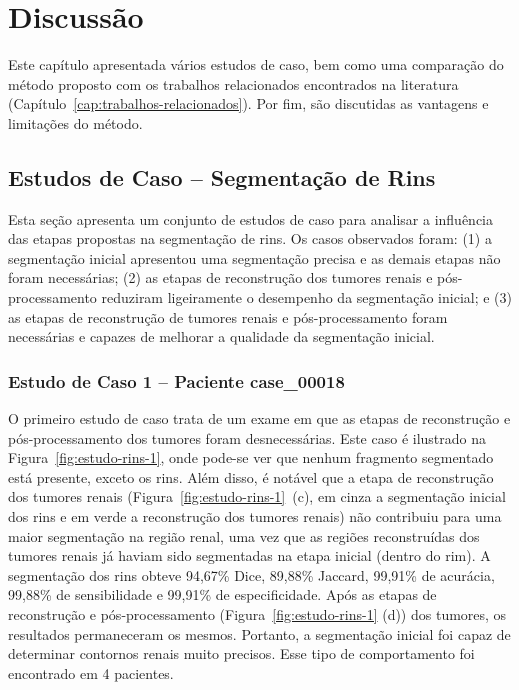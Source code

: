 \chapter{Discussão}
\label{cap:discussao}
\phantom{0}

Este capítulo apresentada vários estudos de caso, bem como uma comparação do método proposto com os trabalhos relacionados encontrados na literatura (Capítulo~\ref{cap:trabalhos-relacionados}). Por fim, são discutidas as vantagens e limitações do método.

\section{Estudos de Caso – Segmentação de Rins}
\label{sec:estudos-segmentacao-rins}

Esta seção apresenta um conjunto de estudos de caso para analisar a influência das etapas propostas na segmentação de rins. Os casos observados foram: (1) a segmentação inicial apresentou uma segmentação precisa e as demais etapas não foram necessárias; (2) as etapas de reconstrução dos tumores renais e pós-processamento reduziram ligeiramente o desempenho da segmentação inicial; e (3) as etapas de reconstrução de tumores renais e pós-processamento foram necessárias e capazes de melhorar a qualidade da segmentação inicial.

\subsection{Estudo de Caso 1 – Paciente case\_00018}
\label{sec:estudo-rins-1}

O primeiro estudo de caso trata de um exame em que as etapas de reconstrução e pós-processamento dos tumores foram desnecessárias. Este caso é ilustrado na Figura~\ref{fig:estudo-rins-1}, onde pode-se ver que nenhum fragmento segmentado está presente, exceto os rins. Além disso, é notável que a etapa de reconstrução dos tumores renais (Figura~\ref{fig:estudo-rins-1}~(c), em cinza a segmentação inicial dos rins e em verde a reconstrução dos tumores renais) não contribuiu para uma maior segmentação na região renal, uma vez que as regiões reconstruídas dos tumores renais já haviam sido segmentadas na etapa inicial (dentro do rim). A segmentação dos rins obteve 94,67\% Dice, 89,88\% Jaccard, 99,91\% de acurácia, 99,88\% de sensibilidade e 99,91\% de especificidade. Após as etapas de reconstrução e pós-processamento (Figura~\ref{fig:estudo-rins-1} (d)) dos tumores, os resultados permaneceram os mesmos. Portanto, a segmentação inicial foi capaz de determinar contornos renais muito precisos. Esse tipo de comportamento foi encontrado em 4 pacientes.

